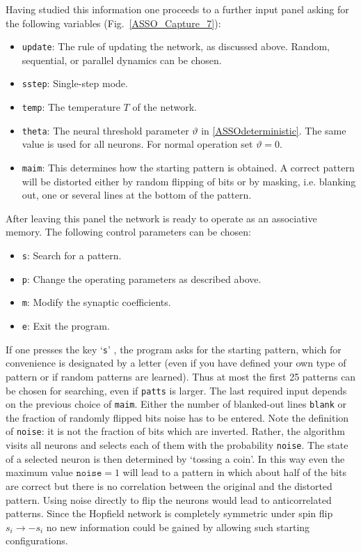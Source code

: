 Having studied this information one proceeds to a further input panel asking for the following variables (Fig.~\ref{ASSO_Capture_7}):
\begin{itemize}
\item \texttt{update}: The rule of updating the network, as discussed above. Random, sequential, or parallel dynamics can be chosen.
\item \texttt{sstep}: Single-step mode.
\item \texttt{temp}: The temperature $T$ of the network.
\item \texttt{theta}: The neural threshold parameter $\vartheta$ in \eqref{ASSOdeterministic}. The same value is used for all neurons. For normal operation set $\vartheta=0$.
\item \texttt{maim}: This determines how the starting pattern is obtained. A correct pattern will be distorted either by random flipping of bits or by masking, i.e. blanking out, one or several lines at the bottom of the pattern.
\end{itemize}

After leaving this panel the network is ready to operate as an associative memory. The following control parameters can be chosen:
\begin{itemize}
\item \texttt{s}: Search for a pattern.
\item \texttt{p}: Change the operating parameters as described above.
\item \texttt{m}: Modify the synaptic coefficients.
\item \texttt{e}: Exit the program.
\end{itemize}
If one presses the key `\texttt{s}' , the program asks for the starting pattern, which for convenience is designated by a letter (even if you have defined your own type of pattern or if random patterns are learned). Thus at most the first 25 patterns can be chosen for searching, even if \texttt{patts} is larger. The last required input depends on the previous choice of \texttt{maim}. Either the number of blanked-out lines \texttt{blank} or the fraction of randomly flipped bits noise has to be entered. Note the definition of \texttt{noise}: it is not the fraction of bits which are inverted. Rather, the algorithm visits all neurons and selects each of them with the probability \texttt{noise}. The state of a selected neuron is then determined by `tossing a coin'. In this way even the maximum value $\texttt{noise}=1$ will lead to a pattern in which about half of the bits are correct but there is no correlation between the original and the distorted pattern. Using noise directly to flip the neurons would lead to anticorrelated patterns. Since the Hopfield network is completely symmetric under spin flip $s_i\rightarrow-s_i$ no new information could be gained by allowing such starting configurations.

